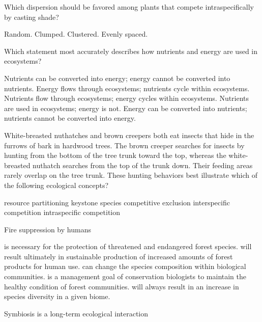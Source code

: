 \question
Which dispersion should be favored among plants that compete intraspecifically by casting   shade?

\begin{choices}
\choice Random. 
\choice Clumped. 
\choice Clustered. 
\correctchoice Evenly spaced. 
\end{choices}

\question
Which statement most accurately describes how nutrients and energy are used in ecosystems?

\begin{choices}
\choice Nutrients can be converted into energy; energy cannot be converted into nutrients. 
\correctchoice Energy flows through ecosystems; nutrients cycle within ecosystems. 
\choice Nutrients flow through ecosystems; energy cycles within ecosystems. 
\choice Nutrients are used in ecosystems; energy is not. 
\choice Energy can be converted into nutrients; nutrients cannot be converted into energy. 
\end{choices}

\question
White-breasted nuthatches and brown creepers both eat insects that hide in the furrows of bark in hardwood trees. The brown creeper searches for insects by hunting from the bottom of the tree trunk toward the top, whereas the white-breasted nuthatch searches from the top of the trunk down. Their feeding areas rarely overlap on the tree trunk. These hunting behaviors best illustrate which of the following ecological concepts?

\begin{choices}
\correctchoice resource partitioning
\choice keystone species
\choice competitive exclusion
\choice interspecific competition
\choice intraspecific competition
\end{choices}

\question
Fire suppression by humans

\begin{choices}
\choice is necessary for the protection of threatened and endangered forest species. 
\choice will result ultimately in sustainable production of increased amounts of forest products for human use. 
\correctchoice can change the species composition within biological communities. 
\choice is a management goal of conservation biologists to maintain the healthy condition of forest communities.
\choice will always result in an increase in species diversity in a given biome. 
\end{choices}

\question
Symbiosis is a long-term ecological interaction

